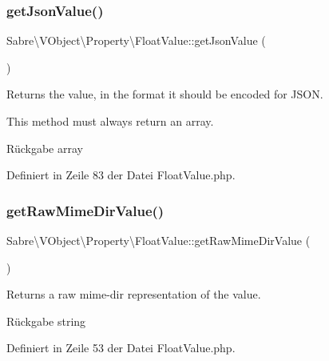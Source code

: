 \subsubsection{\texorpdfstring{get\+Json\+Value()}{getJsonValue()}}
{\footnotesize\ttfamily Sabre\textbackslash{}\+V\+Object\textbackslash{}\+Property\textbackslash{}\+Float\+Value\+::get\+Json\+Value (\begin{DoxyParamCaption}{ }\end{DoxyParamCaption})}

Returns the value, in the format it should be encoded for J\+S\+ON.

This method must always return an array.

\begin{DoxyReturn}{Rückgabe}
array 
\end{DoxyReturn}


Definiert in Zeile 83 der Datei Float\+Value.\+php.

\mbox{\label{class_sabre_1_1_v_object_1_1_property_1_1_float_value_ad40b098ef6a5d1c78c951744053b8565}} 
\subsubsection{\texorpdfstring{get\+Raw\+Mime\+Dir\+Value()}{getRawMimeDirValue()}}
{\footnotesize\ttfamily Sabre\textbackslash{}\+V\+Object\textbackslash{}\+Property\textbackslash{}\+Float\+Value\+::get\+Raw\+Mime\+Dir\+Value (\begin{DoxyParamCaption}{ }\end{DoxyParamCaption})}

Returns a raw mime-\/dir representation of the value.

\begin{DoxyReturn}{Rückgabe}
string 
\end{DoxyReturn}


Definiert in Zeile 53 der Datei Float\+Value.\+php.

\mbox{\label{class_sabre_1_1_v_object_1_1_property_1_1_float_value_af8bf98cfa2baca94e60130547a5038f6}} 
